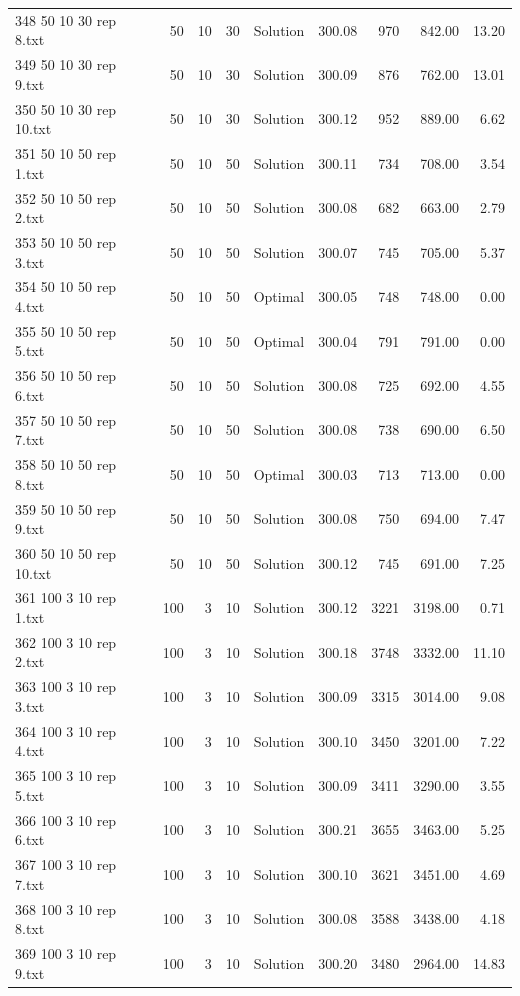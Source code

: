 \begin{longtable}{lrrllrrrr}
348 50 10 30 rep 8.txt & 50 & 10 & 30 & Solution & 300.08 & 970 & 842.00 & 13.20\\
349 50 10 30 rep 9.txt & 50 & 10 & 30 & Solution & 300.09 & 876 & 762.00 & 13.01\\
350 50 10 30 rep 10.txt & 50 & 10 & 30 & Solution & 300.12 & 952 & 889.00 &  6.62\\
351 50 10 50 rep 1.txt & 50 & 10 & 50 & Solution & 300.11 & 734 & 708.00 &  3.54\\
352 50 10 50 rep 2.txt & 50 & 10 & 50 & Solution & 300.08 & 682 & 663.00 &  2.79\\
353 50 10 50 rep 3.txt & 50 & 10 & 50 & Solution & 300.07 & 745 & 705.00 &  5.37\\
354 50 10 50 rep 4.txt & 50 & 10 & 50 & Optimal & 300.05 & 748 & 748.00 &  0.00\\
355 50 10 50 rep 5.txt & 50 & 10 & 50 & Optimal & 300.04 & 791 & 791.00 &  0.00\\
356 50 10 50 rep 6.txt & 50 & 10 & 50 & Solution & 300.08 & 725 & 692.00 &  4.55\\
357 50 10 50 rep 7.txt & 50 & 10 & 50 & Solution & 300.08 & 738 & 690.00 &  6.50\\
358 50 10 50 rep 8.txt & 50 & 10 & 50 & Optimal & 300.03 & 713 & 713.00 &  0.00\\
359 50 10 50 rep 9.txt & 50 & 10 & 50 & Solution & 300.08 & 750 & 694.00 &  7.47\\
360 50 10 50 rep 10.txt & 50 & 10 & 50 & Solution & 300.12 & 745 & 691.00 &  7.25\\
361 100 3 10 rep 1.txt & 100 & 3 & 10 & Solution & 300.12 & 3221 & 3198.00 &  0.71\\
362 100 3 10 rep 2.txt & 100 & 3 & 10 & Solution & 300.18 & 3748 & 3332.00 & 11.10\\
363 100 3 10 rep 3.txt & 100 & 3 & 10 & Solution & 300.09 & 3315 & 3014.00 &  9.08\\
364 100 3 10 rep 4.txt & 100 & 3 & 10 & Solution & 300.10 & 3450 & 3201.00 &  7.22\\
365 100 3 10 rep 5.txt & 100 & 3 & 10 & Solution & 300.09 & 3411 & 3290.00 &  3.55\\
366 100 3 10 rep 6.txt & 100 & 3 & 10 & Solution & 300.21 & 3655 & 3463.00 &  5.25\\
367 100 3 10 rep 7.txt & 100 & 3 & 10 & Solution & 300.10 & 3621 & 3451.00 &  4.69\\
368 100 3 10 rep 8.txt & 100 & 3 & 10 & Solution & 300.08 & 3588 & 3438.00 &  4.18\\
369 100 3 10 rep 9.txt & 100 & 3 & 10 & Solution & 300.20 & 3480 & 2964.00 & 14.83\\

\end{longtable}
